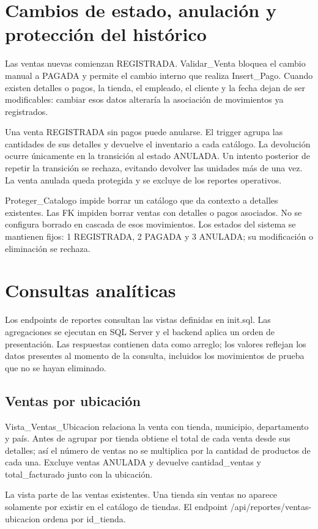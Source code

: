 \section{Cambios de estado, anulación y protección del histórico}
Las ventas nuevas comienzan REGISTRADA. Validar\_Venta bloquea el cambio manual a PAGADA y permite el cambio interno que realiza Insert\_Pago. Cuando existen detalles o pagos, la tienda, el empleado, el cliente y la fecha dejan de ser modificables: cambiar esos datos alteraría la asociación de movimientos ya registrados.

Una venta REGISTRADA sin pagos puede anularse. El trigger agrupa las cantidades de sus detalles y devuelve el inventario a cada catálogo. La devolución ocurre únicamente en la transición al estado ANULADA. Un intento posterior de repetir la transición se rechaza, evitando devolver las unidades más de una vez. La venta anulada queda protegida y se excluye de los reportes operativos.

Proteger\_Catalogo impide borrar un catálogo que da contexto a detalles existentes. Las FK impiden borrar ventas con detalles o pagos asociados. No se configura borrado en cascada de esos movimientos. Los estados del sistema se mantienen fijos: 1 REGISTRADA, 2 PAGADA y 3 ANULADA; su modificación o eliminación se rechaza.

\section{Consultas analíticas}
Los endpoints de reportes consultan las vistas definidas en init.sql. Las agregaciones se ejecutan en SQL Server y el backend aplica un orden de presentación. Las respuestas contienen data como arreglo; los valores reflejan los datos presentes al momento de la consulta, incluidos los movimientos de prueba que no se hayan eliminado.

\subsection{Ventas por ubicación}
Vista\_Ventas\_Ubicacion relaciona la venta con tienda, municipio, departamento y país. Antes de agrupar por tienda obtiene el total de cada venta desde sus detalles; así el número de ventas no se multiplica por la cantidad de productos de cada una. Excluye ventas ANULADA y devuelve cantidad\_ventas y total\_facturado junto con la ubicación.

La vista parte de las ventas existentes. Una tienda sin ventas no aparece solamente por existir en el catálogo de tiendas. El endpoint /api/reportes/ventas-ubicacion ordena por id\_tienda.

